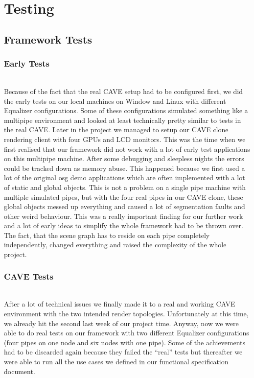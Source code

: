\chapter{Testing}

\section{Framework Tests}
\label{sec:crfTesting}

\subsection{Early Tests}
\label{sec:EarlyTests}\hfill\\
Because of the fact that the real CAVE setup had to be configured first, we did the early tests on our local machines on Window and Linux with different Equalizer configurations. Some of these configurations simulated something like a multipipe environment and looked at least technically pretty similar to tests in the real CAVE. Later in the project we managed to setup our CAVE clone rendering client with four GPUs and LCD monitors. This was the time when we first realised that our framework did not work with a lot of early test applications on this multipipe machine. After some debugging and sleepless nights the errors could be tracked down as memory abuse. This happened because we first used a lot of the original \gls{osg} demo applications which are often implemented with a lot of static and global objects. This is not a problem on a single pipe machine with multiple simulated pipes, but with the four real pipes in our CAVE clone, these global objects messed up everything and caused a lot of segmentation faults and other weird behaviour. This was a really important finding for our further work and a lot of early ideas to simplify the whole framework had to be thrown over. The fact, that the scene graph has to reside on each pipe completely independently, changed everything and raised the complexity of the whole project.

\subsection{CAVE Tests}
\label{sec:CAVETests}\hfill\\
After a lot of technical issues we finally made it to a real and working CAVE environment with the two intended render topologies. Unfortunately at this time, we already hit the second last week of our project time. Anyway, now we were able to do real tests on our framework with two different Equalizer configurations (four pipes on one node and six nodes with one pipe). Some of the achievements had to be discarded again because they failed the ``real'' tests but thereafter we were able to run all the use cases we defined in our functional specification document. 

